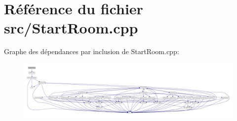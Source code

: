 \section{Référence du fichier src/\-Start\-Room.cpp}
\label{_start_room_8cpp}
Graphe des dépendances par inclusion de Start\-Room.\-cpp\-:\nopagebreak
\begin{figure}[H]
\begin{center}
\leavevmode
\includegraphics[width=350pt]{_start_room_8cpp__incl}
\end{center}
\end{figure}
